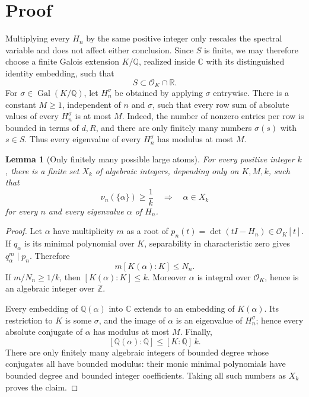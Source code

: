 \documentclass[11pt]{article}
\newtheorem{lemma}{Lemma}
\theoremstyle{definition}
\theoremstyle{remark}
\newcommand{\Q}{\mathbb{Q}}
\newcommand{\R}{\mathbb{R}}
\newcommand{\OK}{\mathcal{O}_K}
\newcommand{\Gal}{\operatorname{Gal}}
\begin{document}
\section{Proof}

Multiplying every $H_n$ by the same positive integer only rescales the
spectral variable and does not affect either conclusion.  Since $S$ is
finite, we may therefore choose a finite Galois extension $K/\Q$, realized
inside $\mathbb C$ with its distinguished identity embedding, such that
\[
                       S\subset\OK\cap\R .
\]
For $\sigma\in\Gal(K/\Q)$, let $H_n^\sigma$ be obtained by applying $\sigma$
entrywise.  There is a constant $M\ge1$, independent of $n$ and $\sigma$,
such that every row sum of absolute values of every $H_n^\sigma$ is at most
$M$.  Indeed, the number of nonzero entries per row is bounded in terms of
$d,R$, and there are only finitely many numbers $\sigma(s)$ with
$s\in S$.  Thus every eigenvalue of every $H_n^\sigma$ has modulus at most
$M$.

\begin{lemma}[Only finitely many possible large atoms]
\label{lem:finite}
For every positive integer $k$, there is a finite set $X_k$ of algebraic
integers, depending only on $K,M,k$, such that
\[
       \nu_n(\{\alpha\})\ge \frac1k
       \quad\Longrightarrow\quad
       \alpha\in X_k
\]
for every $n$ and every eigenvalue $\alpha$ of $H_n$.
\end{lemma}

\begin{proof}
Let $\alpha$ have multiplicity $m$ as a root of
$p_n(t)=\det(tI-H_n)\in\OK[t]$.  If $q_\alpha$ is its minimal polynomial over
$K$, separability in characteristic zero gives $q_\alpha^m\mid p_n$.
Therefore
\[
        m[K(\alpha):K]\le N_n.
\]
If $m/N_n\ge1/k$, then $[K(\alpha):K]\le k$.  Moreover $\alpha$ is integral
over $\OK$, hence is an algebraic integer over $\mathbb Z$.

Every embedding of $\Q(\alpha)$ into $\mathbb C$ extends to an embedding of
$K(\alpha)$.  Its restriction to $K$ is some $\sigma$, and the image of
$\alpha$ is an eigenvalue of $H_n^\sigma$; hence every absolute conjugate of
$\alpha$ has modulus at most $M$.  Finally,
\[
             [\Q(\alpha):\Q]\le [K:\Q]\,k.
\]
There are only finitely many algebraic integers of bounded degree whose
conjugates all have bounded modulus: their monic minimal polynomials have
bounded degree and bounded integer coefficients.  Taking all such numbers as
$X_k$ proves the claim.
\end{proof}
\end{document}
